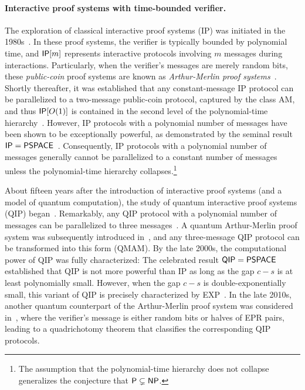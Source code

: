 \documentclass[11pt, a4paper]{article}
\numberwithin{equation}{section}
\numberwithin{figure}{section}
\newcommand{\Ptime}{\textnormal{\textsf{P}}\xspace}
\newcommand{\EXP}{\textnormal{\textsf{EXP}}\xspace}
\newcommand{\NP}{\textnormal{\textsf{NP}}\xspace}
\newcommand{\AM}{\textnormal{\textsf{AM}}\xspace}
\newcommand{\IP}{\textnormal{\textsf{IP}}\xspace}
\newcommand{\QIP}{\textnormal{\textsf{QIP}}\xspace}
\newcommand{\QMAM}{\textnormal{\textsf{QMAM}}\xspace}
\newcommand{\PSPACE}{\textnormal{\textsf{PSPACE}}\xspace}
\begin{document}
\paragraph{Interactive proof systems with time-bounded verifier.}
The exploration of classical interactive proof systems (\IP{}) was initiated in the 1980s~\cite{Babai85,GMR85}. In these proof systems, the verifier is typically bounded by polynomial time, and $\IP[m]$ represents interactive protocols involving $m$ messages during interactions. Particularly, when the verifier's messages are merely random bits, these \textit{public-coin} proof systems are known as \textit{Arthur-Merlin proof systems}~\cite{Babai85}. Shortly thereafter, it was established that any constant-message \IP{} protocol can be parallelized to a two-message public-coin protocol, captured by the class \AM{}, and thus $\IP[O(1)]$ is contained in the second level of the polynomial-time hierarchy~\cite{Babai85,GS86}. However, \IP{} protocols with a polynomial number of messages have been shown to be exceptionally powerful, as demonstrated by the seminal result $\IP = \PSPACE$~\cite{LFKN92,Shamir92}. Consequently, \IP{} protocols with a polynomial number of messages generally cannot be parallelized to a constant number of messages unless the polynomial-time hierarchy collapses.\footnote{The assumption that the polynomial-time hierarchy does not collapse generalizes the conjecture that $\Ptime \subsetneq \NP$.} 

About fifteen years after the introduction of interactive proof systems (and a model of quantum computation), the study of quantum interactive proof systems (\QIP{}) began~\cite{Wat99QIP}. Remarkably, any \QIP{} protocol with a polynomial number of messages can be parallelized to three messages~\cite{KW00}. 
A quantum Arthur-Merlin proof system was subsequently introduced in~\cite{MW05}, and any three-message \QIP{} protocol can be transformed into this form (\QMAM{}).
By the late 2000s, the computational power of \QIP{} was fully characterized: The celebrated result $\QIP{}=\PSPACE{}$~\cite{JJUW11} established that \QIP{} is not more powerful than \IP{} as long as the gap $c-s$ is at least polynomially small. 
However, when the gap $c-s$ is double-exponentially small, this variant of \QIP{} is precisely characterized by \EXP{}~\cite{IKW12}. 
In the late 2010s, another quantum counterpart of the Arthur-Merlin proof system was considered in~\cite{KLGN19}, where the verifier's message is either random bits or halves of EPR pairs, leading to a quadrichotomy theorem that classifies the corresponding \QIP{} protocols. 
\end{document}
